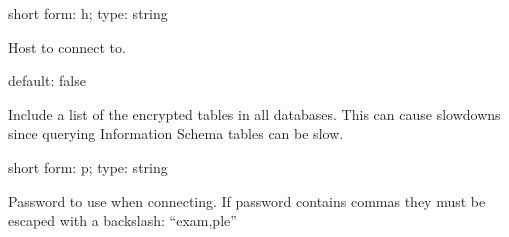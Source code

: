 \documentclass[letterpaper,10pt,english]{sphinxmanual}
\begin{document}
\begin{fulllineitems}
\label{\detokenize{mariadb-database-summary:cmdoption-mariadb-database-summary-host}}
short form: \sphinxhyphen{}h; type: string

Host to connect to.

\end{fulllineitems}


\begin{fulllineitems}
\label{\detokenize{mariadb-database-summary:cmdoption-mariadb-database-summary-list-encrypted-tables}}
default: false

Include a list of the encrypted tables in all databases. This can cause slowdowns since
querying Information Schema tables can be slow.

\end{fulllineitems}


\begin{fulllineitems}
\label{\detokenize{mariadb-database-summary:cmdoption-mariadb-database-summary-password}}
short form: \sphinxhyphen{}p; type: string

Password to use when connecting.
If password contains commas they must be escaped with a backslash: “exam,ple”

\end{fulllineitems}
\end{document}
